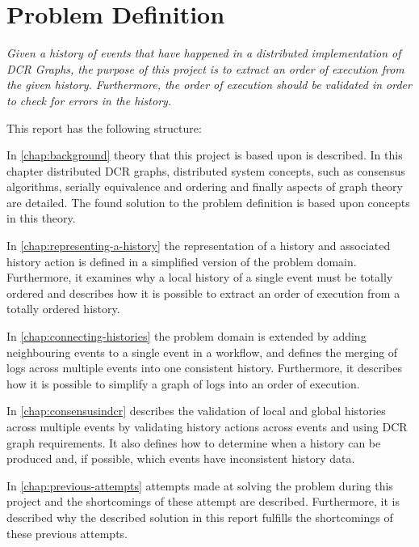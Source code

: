 \section{Problem Definition} %
	\textit{Given a history of events that have happened in a distributed implementation of DCR Graphs, the purpose of this project is to extract an order of execution from the given history. Furthermore, the order of execution should be validated in order to check for errors in the history.}
	
	\vspace{0.6cm}
	
	\newpar
	This report has the following structure:
	
	\newpar
	In \autoref{chap:background} theory that this project is based upon is described. In this chapter distributed DCR graphs, distributed system concepts, such as consensus algorithms, serially equivalence and ordering and finally aspects of graph theory are detailed.
	The found solution to the problem definition is based upon concepts in this theory.
		
	\newpar
	In \autoref{chap:representing-a-history} the representation of a history and associated history action is defined in a simplified version of the problem domain. 
	Furthermore, it examines why a local history of a single event must be totally ordered and describes how it is possible to extract an order of execution from a totally ordered history.
		
	\newpar
	In \autoref{chap:connecting-histories} the problem domain is extended by adding neighbouring events to a single event in a workflow, and defines the merging of logs across multiple events into one consistent history. Furthermore, it describes how it is possible to simplify a graph of logs into an order of execution.
	
	\newpar
	In \autoref{chap:consensusindcr} describes the validation of local and global histories across multiple events by validating history actions across events and using DCR graph requirements. It also defines how to determine when a history can be produced and, if possible, which events have inconsistent history data.
	
	\newpar
	In \autoref{chap:previous-attempts} attempts made at solving the problem during this project and the shortcomings of these attempt are described. Furthermore, it is described why the described solution in this report fulfills the shortcomings of these previous attempts. 
		
	
